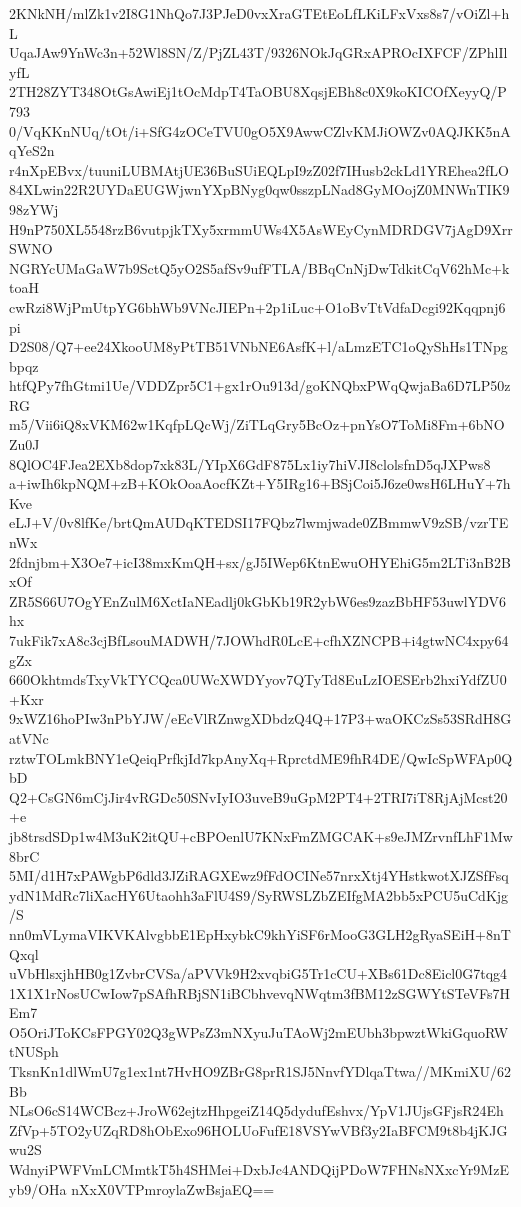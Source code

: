 2KNkNH/mlZk1v2I8G1NhQo7J3PJeD0vxXraGTEtEoLfLKiLFxVxs8s7/vOiZl+hL
UqaJAw9YnWc3n+52Wl8SN/Z/PjZL43T/9326NOkJqGRxAPROcIXFCF/ZPhlIlyfL
2TH28ZYT348OtGsAwiEj1tOcMdpT4TaOBU8XqsjEBh8c0X9koKICOfXeyyQ/P793
0/VqKKnNUq/tOt/i+SfG4zOCeTVU0gO5X9AwwCZlvKMJiOWZv0AQJKK5nAqYeS2n
r4nXpEBvx/tuuniLUBMAtjUE36BuSUiEQLpI9zZ02f7IHusb2ckLd1YREhea2fLO
84XLwin22R2UYDaEUGWjwnYXpBNyg0qw0sszpLNad8GyMOojZ0MNWnTIK998zYWj
H9nP750XL5548rzB6vutpjkTXy5xrmmUWs4X5AsWEyCynMDRDGV7jAgD9XrrSWNO
NGRYcUMaGaW7b9SctQ5yO2S5afSv9ufFTLA/BBqCnNjDwTdkitCqV62hMc+ktoaH
cwRzi8WjPmUtpYG6bhWb9VNcJIEPn+2p1iLuc+O1oBvTtVdfaDcgi92Kqqpnj6pi
D2S08/Q7+ee24XkooUM8yPtTB51VNbNE6AsfK+l/aLmzETC1oQyShHs1TNpgbpqz
htfQPy7fhGtmi1Ue/VDDZpr5C1+gx1rOu913d/goKNQbxPWqQwjaBa6D7LP50zRG
m5/Vii6iQ8xVKM62w1KqfpLQcWj/ZiTLqGry5BcOz+pnYsO7ToMi8Fm+6bNOZu0J
8QlOC4FJea2EXb8dop7xk83L/YIpX6GdF875Lx1iy7hiVJI8clolsfnD5qJXPws8
a+iwIh6kpNQM+zB+KOkOoaAocfKZt+Y5IRg16+BSjCoi5J6ze0wsH6LHuY+7hKve
eLJ+V/0v8lfKe/brtQmAUDqKTEDSI17FQbz7lwmjwade0ZBmmwV9zSB/vzrTEnWx
2fdnjbm+X3Oe7+icI38mxKmQH+sx/gJ5IWep6KtnEwuOHYEhiG5m2LTi3nB2BxOf
ZR5S66U7OgYEnZulM6XctIaNEadlj0kGbKb19R2ybW6es9zazBbHF53uwlYDV6hx
7ukFik7xA8c3cjBfLsouMADWH/7JOWhdR0LcE+cfhXZNCPB+i4gtwNC4xpy64gZx
660OkhtmdsTxyVkTYCQca0UWcXWDYyov7QTyTd8EuLzIOESErb2hxiYdfZU0+Kxr
9xWZ16hoPIw3nPbYJW/eEcVlRZnwgXDbdzQ4Q+17P3+waOKCzSs53SRdH8GatVNc
rztwTOLmkBNY1eQeiqPrfkjId7kpAnyXq+RprctdME9fhR4DE/QwIcSpWFAp0QbD
Q2+CsGN6mCjJir4vRGDc50SNvIyIO3uveB9uGpM2PT4+2TRI7iT8RjAjMcst20+e
jb8trsdSDp1w4M3uK2itQU+cBPOenlU7KNxFmZMGCAK+s9eJMZrvnfLhF1Mw8brC
5MI/d1H7xPAWgbP6dld3JZiRAGXEwz9fFdOCINe57nrxXtj4YHstkwotXJZSfFsq
ydN1MdRc7liXacHY6Utaohh3aFlU4S9/SyRWSLZbZEIfgMA2bb5xPCU5uCdKjg/S
nn0mVLymaVIKVKAlvgbbE1EpHxybkC9khYiSF6rMooG3GLH2gRyaSEiH+8nTQxql
uVbHlsxjhHB0g1ZvbrCVSa/aPVVk9H2xvqbiG5Tr1cCU+XBs61Dc8Eicl0G7tqg4
1X1X1rNosUCwIow7pSAfhRBjSN1iBCbhvevqNWqtm3fBM12zSGWYtSTeVFs7HEm7
O5OriJToKCsFPGY02Q3gWPsZ3mNXyuJuTAoWj2mEUbh3bpwztWkiGquoRWtNUSph
TksnKn1dlWmU7g1ex1nt7HvHO9ZBrG8prR1SJ5NnvfYDlqaTtwa//MKmiXU/62Bb
NLsO6cS14WCBcz+JroW62ejtzHhpgeiZ14Q5dydufEshvx/YpV1JUjsGFjsR24Eh
ZfVp+5TO2yUZqRD8hObExo96HOLUoFufE18VSYwVBf3y2IaBFCM9t8b4jKJGwu2S
WdnyiPWFVmLCMmtkT5h4SHMei+DxbJc4ANDQijPDoW7FHNsNXxcYr9MzEyb9/OHa
nXxX0VTPmroylaZwBsjaEQ==
